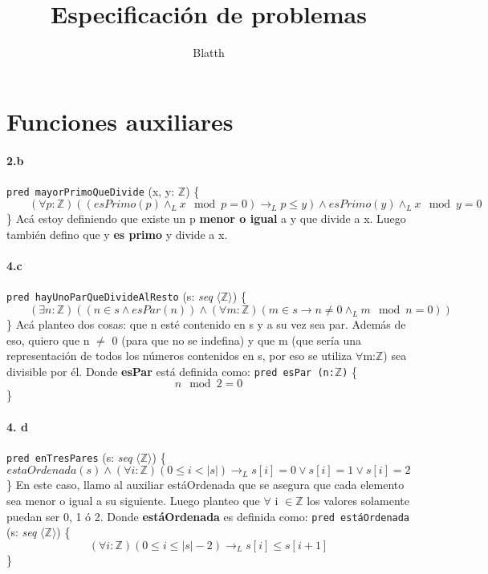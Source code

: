 \documentclass{article}
\begin{document}
\title{Especificación de problemas}
\date{}
\author{Blatth}
\maketitle


\section{Funciones auxiliares}

\paragraph{2.b}
\texttt{pred mayorPrimoQueDivide} (x, y: $\mathbb{Z}$) \{
\[
\qquad (\forall p : \mathbb{Z}) ((esPrimo(p) \land_{L} x \mod p = 0) \rightarrow_{L} p \leq y) \land esPrimo(y) \land_{L} x \mod y = 0 
\]
\qquad \} 
\bigbreak
Acá estoy definiendo que existe un p \textbf{menor o igual} a y que divide a x. Luego también defino que y \textbf{es primo} y divide a x.

\paragraph{4.c}
\texttt{pred hayUnoParQueDivideAlResto} (s: \textit{seq} $\langle \mathbb{Z} \rangle$) \{
\[
\qquad (\exists n : \mathbb{Z})((n \in s \land esPar(n)) \land (\forall m : \mathbb{Z})(m \in s \rightarrow n \neq 0 \land_{L} m \mod n = 0))
\]
\qquad \}
\bigbreak
Acá planteo dos cosas: que n esté contenido en s y a su vez sea par. Además de eso, quiero que n $\neq$ 0 (para que no se indefina) y que m (que sería una representación de todos los números contenidos en s, por eso se utiliza $\forall$m:$\mathbb{Z}$) sea divisible por él.
\bigbreak
Donde \textbf{esPar} está definida como:
\bigbreak
\texttt{pred esPar (n:$\mathbb{Z}$)} \{
\[
n \mod 2 = 0
\]
\qquad \}


\paragraph{4. d}
\texttt{pred enTresPares} (s: \textit{seq} $\langle \mathbb{Z} \rangle$) \{
\[
estaOrdenada(s) \land ( \forall i : \mathbb{Z})(0 \leq i < |s|) \rightarrow_{L} s[i] = 0 \vee s[i] = 1 \vee s[i] = 2
\]
\qquad \}
\bigbreak
En este caso, llamo al auxiliar estáOrdenada que se asegura que cada elemento sea menor o igual a su siguiente. Luego planteo que $\forall$ i $\in \mathbb{Z}$ los valores solamente puedan ser 0, 1 ó 2.
\bigbreak
Donde \textbf{estáOrdenada} es definida como:
\bigbreak
\texttt{pred estáOrdenada} (s: \textit{seq} $\langle \mathbb{Z} \rangle$) \{
\[
(\forall i : \mathbb{Z})(0 \leq i \leq |s|-2) \rightarrow_{L} s[i] \leq s[i+1]
\]
\qquad \}
\texttt{}
\end{document}
